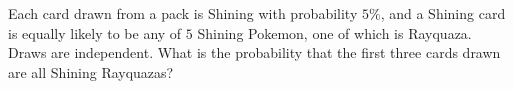 Each card drawn from a pack is Shining with probability $5\%$, and a Shining card is equally likely to be any of $5$ Shining Pokemon, one of which is Rayquaza. Draws are independent. What is the probability that the first three cards drawn are all Shining Rayquazas?
